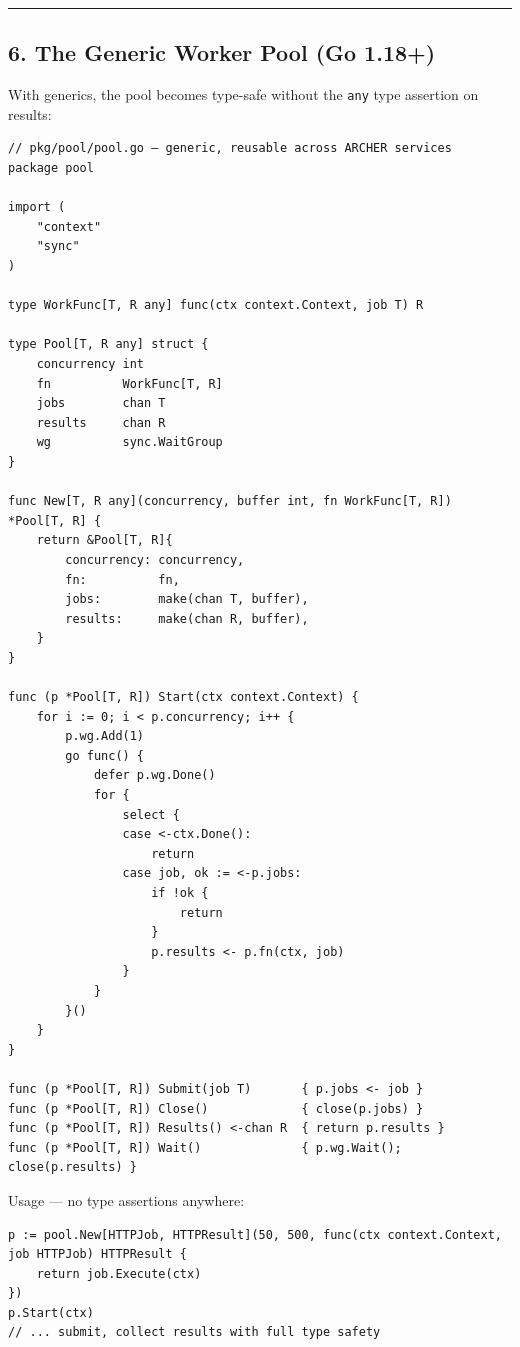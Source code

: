 \documentclass[11pt,a4paper,oneside]{book}
\begin{document}
\begin{center}\rule{0.5\linewidth}{0.5pt}\end{center}

\subsection{6. The Generic Worker Pool (Go
1.18+)}

With generics, the pool becomes type-safe without the \texttt{any} type
assertion on results:

\begin{verbatim}
// pkg/pool/pool.go — generic, reusable across ARCHER services
package pool

import (
    "context"
    "sync"
)

type WorkFunc[T, R any] func(ctx context.Context, job T) R

type Pool[T, R any] struct {
    concurrency int
    fn          WorkFunc[T, R]
    jobs        chan T
    results     chan R
    wg          sync.WaitGroup
}

func New[T, R any](concurrency, buffer int, fn WorkFunc[T, R]) *Pool[T, R] {
    return &Pool[T, R]{
        concurrency: concurrency,
        fn:          fn,
        jobs:        make(chan T, buffer),
        results:     make(chan R, buffer),
    }
}

func (p *Pool[T, R]) Start(ctx context.Context) {
    for i := 0; i < p.concurrency; i++ {
        p.wg.Add(1)
        go func() {
            defer p.wg.Done()
            for {
                select {
                case <-ctx.Done():
                    return
                case job, ok := <-p.jobs:
                    if !ok {
                        return
                    }
                    p.results <- p.fn(ctx, job)
                }
            }
        }()
    }
}

func (p *Pool[T, R]) Submit(job T)       { p.jobs <- job }
func (p *Pool[T, R]) Close()             { close(p.jobs) }
func (p *Pool[T, R]) Results() <-chan R  { return p.results }
func (p *Pool[T, R]) Wait()              { p.wg.Wait(); close(p.results) }
\end{verbatim}

Usage --- no type assertions anywhere:

\begin{verbatim}
p := pool.New[HTTPJob, HTTPResult](50, 500, func(ctx context.Context, job HTTPJob) HTTPResult {
    return job.Execute(ctx)
})
p.Start(ctx)
// ... submit, collect results with full type safety
\end{verbatim}
\end{document}
